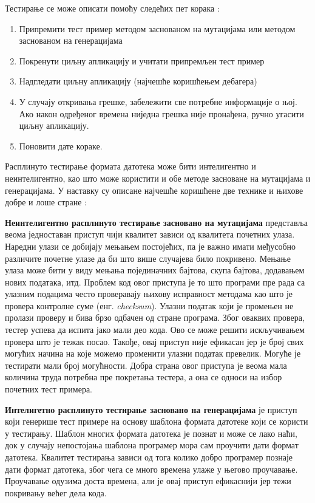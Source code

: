 \documentclass[12pt,oneside]{memoir}
\begin{document}
Тестирање се може описати помоћу следећих пет корака \cite{fuzzingBrute}:
\begin{enumerate}
\item Припремити тест пример методом заснованом на мутацијама или методом заснованом на генерацијама
\item Покренути циљну апликацију и учитати припремљен тест пример
\item Надгледати циљну апликацију (најчешће коришћењем дебагера)
\item У случају откривања грешке, забележити све потребне информације о њој. Ако након одређеног времена ниједна грешка није пронађена, ручно угасити циљну апликацију. 
\item Поновити дате кораке.
\end{enumerate}

Расплинуто тестирање формата датотека може бити интелигентно и неинтелигентно, као што може користити и обе методе засноване на мутацијама и генерацијама. У наставку су описане најчешће коришћене две технике и њихове добре и лоше стране \cite{fuzzingBrute}: 
\begin{description}
\item \textbf{Неинтелигентно расплинуто тестирање засновано на мутацијама} представља веома једноставан приступ чији квалитет зависи од квалитета почетних улаза. Наредни улази се добијају мењањем постојећих, па је важно имати међусобно различите почетне улазе да би што више случајева било покривено. Мењање улаза може бити у виду мењања појединачних бајтова, скупа бајтова, додавањем нових података, итд. Проблем код овог приступа је то што програми пре рада са улазним подацима често проверавају њихову исправност методама као што је провера контролне суме (енг. \textit{checksum}). Улазни податак који је промењен не пролази проверу и бива брзо одбачен од стране програма. Због оваквих провера, тестер успева да испита јако мали део кода. Ово се може решити искључивањем провера што је тежак посао. Такође, овај приступ није ефикасан јер је број свих могућих начина на које можемо променити улазни податак превелик. Могуће је тестирати мали број могућности. Добра страна овог приступа је веома мала количина труда потребна пре покретања тестера, а она се односи на избор почетних тест примера. 
\item \textbf{Интелигетно расплинуто тестирање засновано на генерацијама} је приступ који генерише тест примере на основу шаблона формата датотеке који се користи у тестирању. Шаблон многих формата датотека је познат и може се лако наћи, док у случају непостојања шаблона програмер мора сам проучити дати формат датотека. Квалитет тестирања зависи од тога колико добро програмер познаје дати формат датотека, због чега се много времена улаже у његово проучавање. Проучавање одузима доста времена, али је овај приступ ефикаснији јер тежи покривању већег дела кода.
\end{description}
\end{document}
